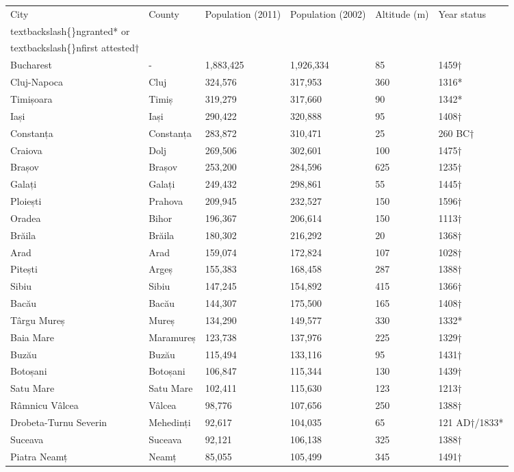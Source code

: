 \documentclass{article}
\begin{document}
\begin{tabular}{llllll}
\toprule
City & County & Population (2011) & Population (2002) & Altitude (m) & Year status\\textbackslash\{\}ngranted* or\\textbackslash\{\}nfirst attested† \\
\midrule
Bucharest & - & 1,883,425 & 1,926,334 & 85 & 1459† \\
Cluj-Napoca & Cluj & 324,576 & 317,953 & 360 & 1316* \\
Timișoara & Timiș & 319,279 & 317,660 & 90 & 1342* \\
Iași & Iași & 290,422 & 320,888 & 95 & 1408† \\
Constanța & Constanța & 283,872 & 310,471 & 25 & 260 BC† \\
Craiova & Dolj & 269,506 & 302,601 & 100 & 1475† \\
Brașov & Brașov & 253,200 & 284,596 & 625 & 1235† \\
Galați & Galați & 249,432 & 298,861 & 55 & 1445† \\
Ploiești & Prahova & 209,945 & 232,527 & 150 & 1596† \\
Oradea & Bihor & 196,367 & 206,614 & 150 & 1113† \\
Brăila & Brăila & 180,302 & 216,292 & 20 & 1368† \\
Arad & Arad & 159,074 & 172,824 & 107 & 1028† \\
Pitești & Argeș & 155,383 & 168,458 & 287 & 1388† \\
Sibiu & Sibiu & 147,245 & 154,892 & 415 & 1366† \\
Bacău & Bacău & 144,307 & 175,500 & 165 & 1408† \\
Târgu Mureș & Mureș & 134,290 & 149,577 & 330 & 1332* \\
Baia Mare & Maramureș & 123,738 & 137,976 & 225 & 1329† \\
Buzău & Buzău & 115,494 & 133,116 & 95 & 1431† \\
Botoșani & Botoșani & 106,847 & 115,344 & 130 & 1439† \\
Satu Mare & Satu Mare & 102,411 & 115,630 & 123 & 1213† \\
Râmnicu Vâlcea & Vâlcea & 98,776 & 107,656 & 250 & 1388† \\
Drobeta-Turnu Severin & Mehedinți & 92,617 & 104,035 & 65 & 121 AD†/1833* \\
Suceava & Suceava & 92,121 & 106,138 & 325 & 1388† \\
Piatra Neamț & Neamț & 85,055 & 105,499 & 345 & 1491† \\

\end{tabular}
\end{document}
